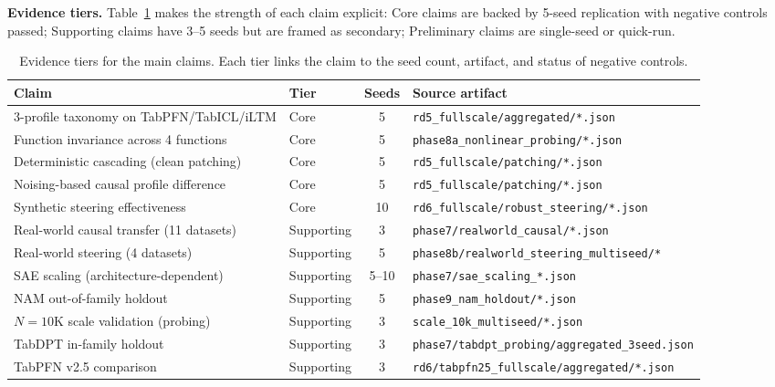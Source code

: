 \documentclass{article}
\begin{document}
\textbf{Evidence tiers.} Table~\ref{tab:evidence-tiers} makes the strength of each claim explicit: Core claims are backed by 5-seed replication with negative controls passed; Supporting claims have 3--5 seeds but are framed as secondary; Preliminary claims are single-seed or quick-run.

\begin{table}[h]
\centering
\caption{Evidence tiers for the main claims. Each tier links the claim to the seed count, artifact, and status of negative controls.}
\label{tab:evidence-tiers}
\scriptsize
\setlength{\tabcolsep}{4pt}
\begin{tabular}{@{}p{5.6cm} l c >{\raggedright\arraybackslash}p{5.6cm}@{}}
\toprule
Claim & Tier & Seeds & Source artifact \\
\midrule
3-profile taxonomy on TabPFN/TabICL/iLTM & Core & 5 & \texttt{rd5\_fullscale/aggregated/*.json} \\
Function invariance across 4 functions & Core & 5 & \texttt{phase8a\_nonlinear\_probing/*.json} \\
Deterministic cascading (clean patching) & Core & 5 & \texttt{rd5\_fullscale/patching/*.json} \\
Noising-based causal profile difference & Core & 5 & \texttt{rd5\_fullscale/patching/*.json} \\
Synthetic steering effectiveness & Core & 10 & \texttt{rd6\_fullscale/robust\_steering/*.json} \\
Real-world causal transfer (11 datasets) & Supporting & 3 & \texttt{phase7/realworld\_causal/*.json} \\
Real-world steering (4 datasets) & Supporting & 5 & \texttt{phase8b/realworld\_steering\_multiseed/*} \\
SAE scaling (architecture-dependent) & Supporting & 5--10 & \texttt{phase7/sae\_scaling\_*.json} \\
NAM out-of-family holdout & Supporting & 5 & \texttt{phase9\_nam\_holdout/*.json} \\
$N{=}10$K scale validation (probing) & Supporting & 3 & \texttt{scale\_10k\_multiseed/*.json} \\
TabDPT in-family holdout & Supporting & 3 & \texttt{phase7/tabdpt\_probing/aggregated\_3seed.json} \\
TabPFN v2.5 comparison & Supporting & 3 & \texttt{rd6/tabpfn25\_fullscale/aggregated/*.json} \\
\bottomrule
\end{tabular}
\end{table}
\end{document}
